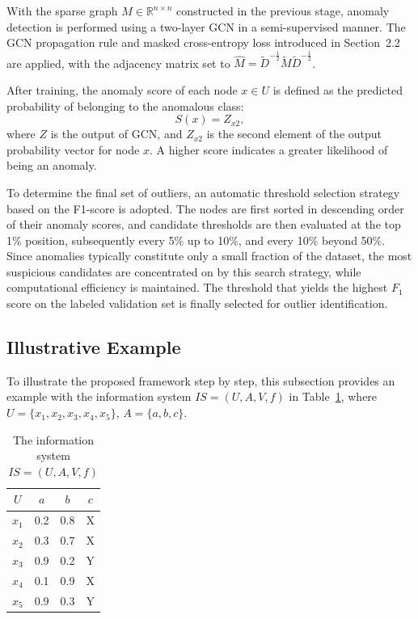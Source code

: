 \documentclass[lettersize,journal]{IEEEtran}
\begin{document}
With the sparse graph \(M \in \mathbb{R}^{n \times n}\) constructed in the previous stage, anomaly
detection is performed using a two-layer GCN in a semi-supervised manner. The GCN propagation rule and
masked cross-entropy loss introduced in Section~2.2 are applied, with the adjacency matrix set to
\(\widehat{M} = \widetilde{D}^{-\frac{1}{2}} \widetilde{M} \widetilde{D}^{-\frac{1}{2}}\).

After training, the anomaly score of each node \(x \in U\) is defined as the predicted probability of
belonging to the anomalous class:
\begin{equation}
S(x) = Z_{x2},
\end{equation}
where \(Z\) is the output of GCN, and \(Z_{x2}\) is the second element of the output probability vector
for node \(x\). A higher score indicates a greater likelihood of being an anomaly.

To determine the final set of outliers, an automatic threshold selection strategy based on the F1-score
is adopted. The nodes are first sorted in descending order of their anomaly scores, and candidate
thresholds are then evaluated at the top 1\% position, subsequently every 5\% up to 10\%, and every
10\% beyond 50\%. Since anomalies typically constitute only a small fraction of the dataset, the most
suspicious candidates are concentrated on by this search strategy, while computational efficiency is
maintained. The threshold that yields the highest \(F_{1}\) score on the labeled validation set is
finally selected for outlier identification.

\subsection{Illustrative Example}

To illustrate the proposed framework step by step, this subsection provides an example with the
information system \(IS = (U, A, V, f)\) in Table~\ref{tab:example_is}, where
\(U = \{x_{1}, x_{2}, x_{3}, x_{4}, x_{5}\}\), \(A = \{a, b, c\}\).

\begin{table}[!t]
\caption{The information system \(IS = (U, A, V, f)\)}
\label{tab:example_is}
\centering
\begin{tabular}{cccc}
\toprule
\(U\) & \(a\) & \(b\) & \(c\) \\
\midrule
\(x_{1}\) & 0.2 & 0.8 & X \\
\(x_{2}\) & 0.3 & 0.7 & X \\
\(x_{3}\) & 0.9 & 0.2 & Y \\
\(x_{4}\) & 0.1 & 0.9 & X \\
\(x_{5}\) & 0.9 & 0.3 & Y \\
\bottomrule
\end{tabular}
\end{table}
\end{document}
